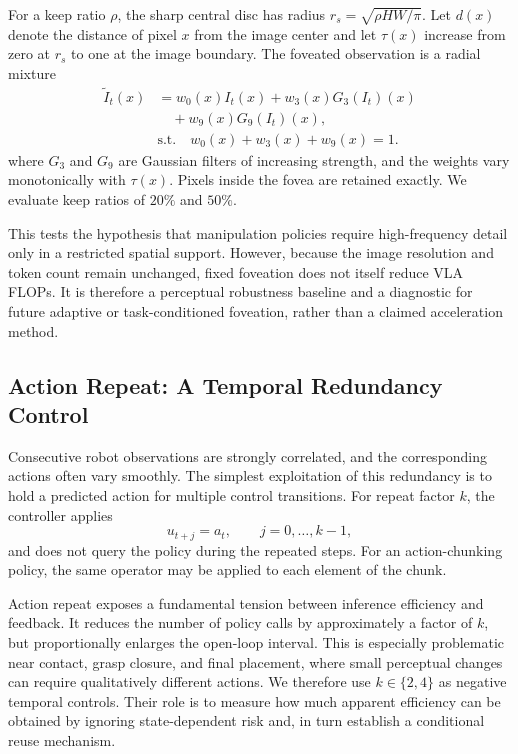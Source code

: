 \documentclass[letterpaper, 10 pt, conference]{ieeeconf}
\begin{document}
For a keep ratio $\rho$, the sharp central disc has radius
$r_s=\sqrt{\rho HW/\pi}$. Let $d(x)$ denote the distance of pixel $x$ from the
image center and let $\tau(x)$ increase from zero at $r_s$ to one at the image
boundary. The foveated observation is a radial mixture
\begin{equation}
\begin{aligned}
\widetilde I_t(x)
&= w_0(x)I_t(x) + w_3(x)G_3(I_t)(x) \\
&\quad + w_9(x)G_9(I_t)(x), \\
&\text{s.t.}\quad
w_0(x)+w_3(x)+w_9(x)=1.
\end{aligned}
\label{eq:foveation}
\end{equation}
where $G_3$ and $G_9$ are Gaussian filters of increasing strength, and the
weights vary monotonically with $\tau(x)$. Pixels inside the fovea are retained
exactly. We evaluate keep ratios of $20\%$ and $50\%$.


This tests the hypothesis that manipulation policies require high-frequency detail
only in a restricted spatial support. However, because the image resolution
and token count remain unchanged, fixed foveation does not itself reduce VLA
FLOPs. It is therefore a perceptual robustness baseline and a diagnostic for
future adaptive or task-conditioned foveation, rather than a claimed
acceleration method.

\subsection{Action Repeat: A Temporal Redundancy Control}
\label{sec:method_action_repeat}

Consecutive robot observations are strongly correlated, and the corresponding
actions often vary smoothly. The simplest exploitation of this redundancy is
to hold a predicted action for multiple control transitions. For repeat factor
$k$, the controller applies
\begin{equation}
    u_{t+j}=a_t,\qquad j=0,\ldots,k-1,
    \label{eq:action_repeat}
\end{equation}
and does not query the policy during the repeated steps. For an action-chunking
policy, the same operator may be applied to each element of the chunk.

Action repeat exposes a fundamental tension between inference efficiency and
feedback. It reduces the number of policy calls by approximately a factor of
$k$, but proportionally enlarges the open-loop interval. This is especially
problematic near contact, grasp closure, and final placement, where small
perceptual changes can require qualitatively different actions. We therefore
use $k\in\{2,4\}$ as negative temporal controls. Their role is to measure how
much apparent efficiency can be obtained by ignoring state-dependent risk and,
in turn establish a conditional reuse mechanism.
\end{document}
